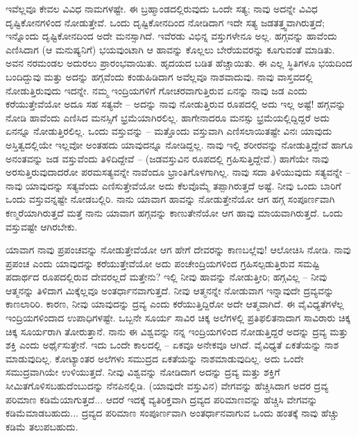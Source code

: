 ಇವೆಲ್ಲವೂ ಕೇವಲ ವಿವಿಧ ನಾಮಗಳಷ್ಟೇ. ಈ ಬ್ರಹ್ಮಾಂಡದಲ್ಲಿರುವುದು ಒಂದೇ ಸತ್ಯ; ನಾವು ಅದನ್ನೇ ವಿವಿಧ ದೃಷ್ಟಿಕೋನಗಳಿಂದ ನೋಡುತ್ತೇವೆ. ಒಂದು ದೃಷ್ಟಿಕೋನದಿಂದ ನೋಡಿದಾಗ ಇದೇ ಸತ್ಯ ಜಡತತ್ತ್ವವಾಗಿರುತ್ತದೆ; ಇನ್ನೊಂದು ದೃಷ್ಟಿಕೋನದಿಂದ ಅದೇ ಮನಸ್ಸಾಗಿದೆ. ಇವೆರಡು ವಿಭಿನ್ನ ವಸ್ತುಗಳೇನೂ ಅಲ್ಲ. ಹಗ್ಗವನ್ನು ಹಾವೆಂದು ಎಣಿಸಿದಾಗ (ಆ ಮನುಷ್ಯನಿಗೆ) ಭಯವುಂಟಾಗಿ ಆ ಹಾವನ್ನು ಕೊಲ್ಲಲು ಬೇರೆಯವರನ್ನು ಕೂಗುವಂತೆ ಮಾಡಿತು. ಅವನ ನರಮಂಡಲ ಅದುರಲು ಪ್ರಾರಂಭವಾಯಿತು. ಹೃದಯದ ಬಡಿತ ಹೆಚ್ಚಾಯಿತು. ಈ ಎಲ್ಲ ಸ್ಥಿತಿಗಳೂ ಭಯದಿಂದ ಬಂದಿದ್ದುವು ಮತ್ತು ಅದನ್ನು ಹಗ್ಗವೆಂದು ಕಂಡುಹಿಡಿದಾಗ ಅವೆಲ್ಲವೂ ನಾಶವಾದುವು. ನಾವು ವಾಸ್ತವದಲ್ಲಿ ನೋಡುತ್ತಿರುವುದು ಇದನ್ನೇ. ನಮ್ಮ ಇಂದ್ರಿಯಗಳಿಗೆ ಗೋಚರವಾಗುತ್ತಿರುವ ಏನನ್ನು ನಾವು ಜಡ ಎಂದು ಕರೆಯುತ್ತೇವೆಯೋ ಅದೂ ಸಹ ಸತ್ಯವೇ – ಅದನ್ನು ನಾವು ನೋಡುತ್ತಿರುವ ರೂಪದಲ್ಲಿ ಅದು ಇಲ್ಲ ಅಷ್ಟೆ! ಹಗ್ಗವನ್ನು ನೋಡಿ ಹಾವೆಂದು ಎಣಿಸಿದ ಮನಸ್ಸಿಗೆ ಭ್ರಮೆಯಾಗಿರಲಿಲ್ಲ. ಹಾಗೇನಾದರೂ ಮನಸ್ಸು ಭ್ರಮೆಯಲ್ಲಿದ್ದಿದ್ದರೆ ಅದು ಏನನ್ನೂ ನೋಡುತ್ತಿರಲಿಲ್ಲ. ಒಂದು ವಸ್ತುವನ್ನು – ಮತ್ತೊಂದು ವಸ್ತುವಾಗಿ ಎಣಿಸಲಾಯಿತಷ್ಟೇ ವಿನಃ ಯಾವುದು ಅಸ್ತಿತ್ವದಲ್ಲಿಯೇ ಇಲ್ಲವೋ ಅಂತಹದು ಯಾವುದನ್ನೂ ನೋಡಿದ್ದಲ್ಲ. ನಾವು ಇಲ್ಲಿ ಶರೀರವನ್ನು ನೋಡುತ್ತಿದ್ದೇವೆ ಹಾಗೂ ಅನಂತವನ್ನು ಜಡ ವಸ್ತುವೆಂದು ತಿಳಿದಿದ್ದೇವೆ – (ಜಡವಸ್ತುವಿನ ರೂಪದಲ್ಲಿ ಗ್ರಹಿಸುತ್ತಿದ್ದೇವೆ.) ಹಾಗೆಯೇ ನಾವು ಅರಸುತ್ತಿರುವುದಾದರೋ ಪರಮಸತ್ಯವನ್ನೇ ನಾವೆಂದೂ ಭ್ರಾಂತಿಗೊಳಗಾಗಿಲ್ಲ. ನಾವು ಸದಾ ತಿಳಿಯುವುದು ಸತ್ಯವನ್ನೇ – ನಾವು ಯಾವುದನ್ನು ಸತ್ಯವೆಂದು ಎಣಿಸುತ್ತೇವೆಯೋ ಅದು ಕೆಲವೊಮ್ಮೆ ತಪ್ಪಾಗಿರುತ್ತದೆ ಅಷ್ಟೆ. ನೀವು ಒಂದು ಬಾರಿಗೆ ಒಂದು ವಸ್ತುವನ್ನಷ್ಟೇ ನೋಡಬಲ್ಲಿರಿ. ನಾನು ಯಾವಾಗ ಹಾವನ್ನು ನೋಡುತ್ತೇನೆಯೋ ಆಗ ಹಗ್ಗ ಸಂಪೂರ್ಣವಾಗಿ ಕಣ್ಮರೆಯಾಗಿರುತ್ತದೆ ಮತ್ತೆ ನಾನು ಯಾವಾಗ ಹಗ್ಗವನ್ನು ಕಾಣುತೇನೆಯೋ ಆಗ ಹಾವು ಮಾಯವಾಗಿರುತ್ತದೆ. ಒಂದು ವಸ್ತುವಷ್ಟೇ ಆಗಿರಬೇಕು.

\vskip 6pt

ಯಾವಾಗ ನಾವು ಪ್ರಪಂಚವನ್ನು ನೋಡುತ್ತೇವೆಯೋ ಆಗ ಹೇಗೆ ದೇವರನ್ನು ಕಾಣಬಲ್ಲೆವು! ಆಲೋಚಿಸಿ ನೋಡಿ. ನಾವು ಪ್ರಪಂಚ ಎಂದು ಯಾವುದನ್ನು ಕರೆಯುತ್ತೇವೆಯೋ ಅದು ಪಂಚೇಂದ್ರಿಯಗಳಿಂದ ಗ್ರಹಿಸಲ್ಪಡುತ್ತಿರುವ ಸಮಷ್ಟಿ ಪದಾರ್ಥದ ರೂಪದಲ್ಲಿರುವ ದೇವರಲ್ಲದೆ ಮತ್ತೇನು? ಇಲ್ಲಿ ನೀವು ಹಾವನ್ನು ನೋಡುತ್ತೀರಿ; ಹಗ್ಗವಿಲ್ಲ – ನೀವು ಆತ್ಮನನ್ನು ತಿಳಿದಾಗ ಮಿಕ್ಕೆಲ್ಲವೂ ಅಂತರ್ಧಾನವಾಗುತ್ತದೆ. ನೀವು ಆತ್ಮನನ್ನೇ ನೋಡುವಾಗ ಇನ್ನಾವುದೇ ದ್ರವ್ಯವನ್ನು ಕಾಣಲಾರಿರಿ. ಕಾರಣ, ನೀವು ಯಾವುದನ್ನು ದ್ರವ್ಯ ಎಂದು ಕರೆಯುತ್ತಿದ್ದಿರೋ ಅದೇ ಆತ್ಮವಾಗಿದೆ. ಈ ವೈವಿಧ್ಯತೆಗಳೆಲ್ಲ ಇಂದ್ರಿಯಗಳಿಂದಾದ ಉಪಾಧಿಗಳಷ್ಟೇ. ಒಬ್ಬನೇ ಸೂರ್ಯ ಸಾವಿರ ಚಿಕ್ಕ ಅಲೆಗಳಲ್ಲಿ ಪ್ರತಿಫಲಿತನಾದಾಗ ಸಾವಿರಾರು ಚಿಕ್ಕ ಚಿಕ್ಕ ಸೂರ್ಯರಾಗಿ ತೋರುತ್ತಾನೆ. ನಾನು ಈ ವಿಶ್ವವನ್ನು ನನ್ನ ಇಂದ್ರಿಯಗಳಿಂದ ನೋಡುತ್ತಿದ್ದರೆ ಅದನ್ನು ದ್ರವ್ಯ ಮತ್ತು ಶಕ್ತಿ ಎಂದು ಅರ್ಥೈಸುತ್ತೇನೆ. ಇದು ಒಂದೇ ಕಾಲದಲ್ಲಿ – ಏಕವೂ ಅನೇಕವೂ ಆಗಿದೆ. ವೈವಿಧ್ಯತೆ ಏಕತೆಯನ್ನು ನಾಶ ಮಾಡುವುದಿಲ್ಲ. ಕೋಟ್ಯಾಂತರ ಅಲೆಗಳು ಸಮುದ್ರದ ಏಕತೆಯನ್ನು ನಾಶಮಾಡುವುದಿಲ್ಲ. ಅದು ಒಂದೇ ಸಮುದ್ರವಾಗಿಯೇ ಉಳಿಯುತ್ತದೆ. ನೀವು ವಿಶ್ವವನ್ನು ನೋಡಿದಾಗ ಅದನ್ನು ದ್ರವ್ಯ ಮತ್ತು ಶಕ್ತಿಗೆ ಸೀಮಿತಗೊಳಿಸ\break ಬಹುದೆಂಬುದನ್ನು ನೆನಪಿನಲ್ಲಿಡಿ. (ಯಾವುದೇ ವಸ್ತುವಿನ) ವೇಗವನ್ನು ಹೆಚ್ಚಿಸಿದಾಗ ಅದರ ದ್ರವ್ಯ ಪರಿಮಾಣ ಕಡಿಮೆಯಾಗುತ್ತದೆ... ಆದರೆ ಇದಕ್ಕೆ ವ್ಯತಿರಿಕ್ತವಾಗಿ ದ್ರವ್ಯದ ಪರಿಮಾಣವನ್ನು ಹೆಚ್ಚಿಸಿ ವೇಗವನ್ನು ಕಡಿಮೆಮಾಡಬಹುದು... ದ್ರವ್ಯದ ಪರಿಮಾಣ ಸಂಪೂರ್ಣವಾಗಿ ಅಂತರ್ಧಾನವಾಗುವ ಒಂದು ಹಂತಕ್ಕೆ ನಾವು ಹೆಚ್ಚು ಕಡಿಮೆ ತಲುಪಬಹುದು.

